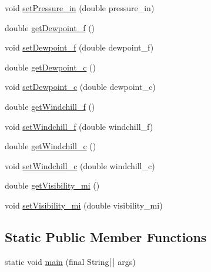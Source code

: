\begin{DoxyCompactItemize}
\item 
void \hyperlink{classgov_1_1fnal_1_1ppd_1_1dd_1_1xml_1_1news_1_1current__observation_a9174ac715d99a4b02ed3a9fadcba3186}{set\-Pressure\-\_\-in} (double pressure\-\_\-in)
\item 
double \hyperlink{classgov_1_1fnal_1_1ppd_1_1dd_1_1xml_1_1news_1_1current__observation_ab72237eac7ba53c3dd718f76d3e2cfdb}{get\-Dewpoint\-\_\-f} ()
\item 
void \hyperlink{classgov_1_1fnal_1_1ppd_1_1dd_1_1xml_1_1news_1_1current__observation_a9f5ad4096e55bcdbd8fdc72a9d2fa76f}{set\-Dewpoint\-\_\-f} (double dewpoint\-\_\-f)
\item 
double \hyperlink{classgov_1_1fnal_1_1ppd_1_1dd_1_1xml_1_1news_1_1current__observation_abdf79e90ee3f08fd165020ffc13cc04e}{get\-Dewpoint\-\_\-c} ()
\item 
void \hyperlink{classgov_1_1fnal_1_1ppd_1_1dd_1_1xml_1_1news_1_1current__observation_a30e253961743db2801f6d17488f1e29c}{set\-Dewpoint\-\_\-c} (double dewpoint\-\_\-c)
\item 
double \hyperlink{classgov_1_1fnal_1_1ppd_1_1dd_1_1xml_1_1news_1_1current__observation_a0c80772bef406cf38ec42d671c0e602b}{get\-Windchill\-\_\-f} ()
\item 
void \hyperlink{classgov_1_1fnal_1_1ppd_1_1dd_1_1xml_1_1news_1_1current__observation_a4fdee07608f08a5129c42493733165ed}{set\-Windchill\-\_\-f} (double windchill\-\_\-f)
\item 
double \hyperlink{classgov_1_1fnal_1_1ppd_1_1dd_1_1xml_1_1news_1_1current__observation_ab0fee3db8ee6038f8f8c484c10bdefc7}{get\-Windchill\-\_\-c} ()
\item 
void \hyperlink{classgov_1_1fnal_1_1ppd_1_1dd_1_1xml_1_1news_1_1current__observation_a594551d4a2e2116d6dbd8743a5a476c6}{set\-Windchill\-\_\-c} (double windchill\-\_\-c)
\item 
double \hyperlink{classgov_1_1fnal_1_1ppd_1_1dd_1_1xml_1_1news_1_1current__observation_a54825110265e610c987ec246e77f72fa}{get\-Visibility\-\_\-mi} ()
\item 
void \hyperlink{classgov_1_1fnal_1_1ppd_1_1dd_1_1xml_1_1news_1_1current__observation_a9b3bd81568b80dcf542be79839161b2d}{set\-Visibility\-\_\-mi} (double visibility\-\_\-mi)
\end{DoxyCompactItemize}
\subsection*{Static Public Member Functions}
\begin{DoxyCompactItemize}
\item 
static void \hyperlink{classgov_1_1fnal_1_1ppd_1_1dd_1_1xml_1_1news_1_1current__observation_a5d091b24033393302afa9f1f5cef1435}{main} (final String\mbox{[}$\,$\mbox{]} args)
\end{DoxyCompactItemize}


